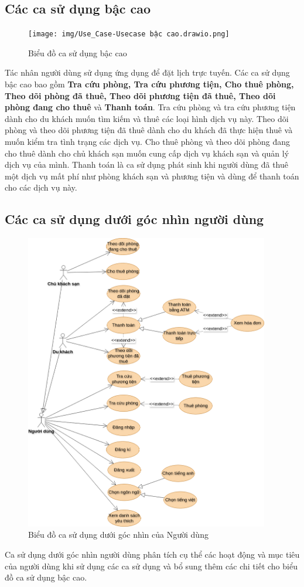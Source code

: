 \subsection{Các ca sử dụng bậc cao}
\begin{figure}[H]
    \centering
    \texttt{[image: img/Use\_Case-Usecase bậc cao.drawio.png]} 
    \caption{Biểu đồ ca sử dụng bậc cao}
\end{figure}
Tác nhân người dùng sử dụng ứng dụng để đặt lịch trực tuyến. Các ca sử dụng bậc cao bao gồm \textbf{Tra cứu phòng, Tra cứu phương tiện, Cho thuê phòng, Theo dõi phòng đã thuê, Theo dõi phương tiện đã thuê, Theo dõi phòng đang cho thuê} và \textbf{Thanh toán}. Tra cứu phòng và tra cứu phương tiện dành cho du khách muốn tìm kiếm và thuê các loại hình dịch vụ này. Theo dõi phòng và theo dõi phương tiện đã thuê dành cho du khách đã thực hiện thuê và muốn kiểm tra tình trạng các dịch vụ. Cho thuê phòng và theo dõi phòng đang cho thuê dành cho chủ khách sạn muốn cung cấp dịch vụ khách sạn và quản lý dịch vụ của mình. Thanh toán là ca sử dụng phát sinh khi người dùng đã thuê một dịch vụ mất phí như phòng khách sạn và phương tiện và dùng để thanh toán cho các dịch vụ này.

\subsection{Các ca sử dụng dưới góc nhìn người dùng}
\begin{figure}[H]
    \centering
    \includegraphics[width=0.95\textwidth]{img/Use_Case-Use case dưới góc nhìn người sử dụng.drawio.png} 
    \caption{Biểu đồ ca sử dụng dưới góc nhìn của Người dùng}
\end{figure}
Ca sử dụng dưới góc nhìn người dùng phân tích cụ thể các hoạt động và mục tiêu của người dùng khi sử dụng các ca sử dụng và bổ sung thêm các chi tiết cho biểu đồ ca sử dụng bậc cao. 
